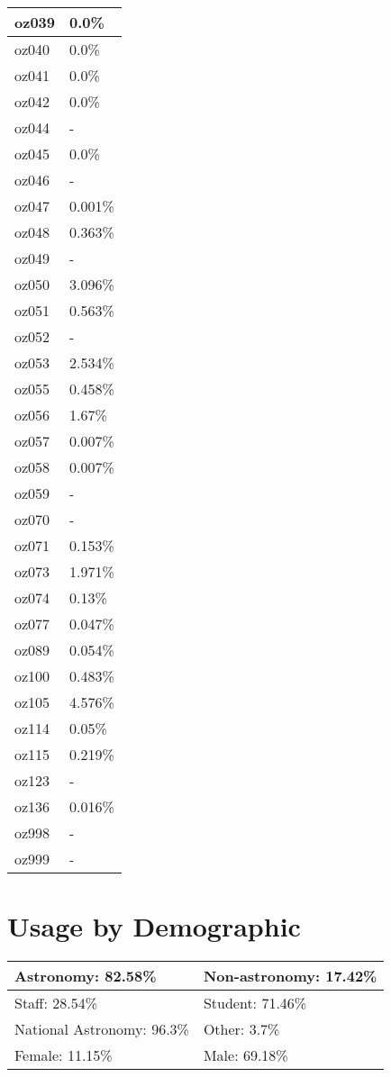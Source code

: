 \documentclass{article}%
\begin{document}
\begin{longtabu}{X[l] X[r]}
\hline%
oz039&0.0\%\\%
\hline%
oz040&0.0\%\\%
\hline%
oz041&0.0\%\\%
\hline%
oz042&0.0\%\\%
\hline%
oz044&{-}\\%
\hline%
oz045&0.0\%\\%
\hline%
oz046&{-}\\%
\hline%
oz047&0.001\%\\%
\hline%
oz048&0.363\%\\%
\hline%
oz049&{-}\\%
\hline%
oz050&3.096\%\\%
\hline%
oz051&0.563\%\\%
\hline%
oz052&{-}\\%
\hline%
oz053&2.534\%\\%
\hline%
oz055&0.458\%\\%
\hline%
oz056&1.67\%\\%
\hline%
oz057&0.007\%\\%
\hline%
oz058&0.007\%\\%
\hline%
oz059&{-}\\%
\hline%
oz070&{-}\\%
\hline%
oz071&0.153\%\\%
\hline%
oz073&1.971\%\\%
\hline%
oz074&0.13\%\\%
\hline%
oz077&0.047\%\\%
\hline%
oz089&0.054\%\\%
\hline%
oz100&0.483\%\\%
\hline%
oz105&4.576\%\\%
\hline%
oz114&0.05\%\\%
\hline%
oz115&0.219\%\\%
\hline%
oz123&{-}\\%
\hline%
oz136&0.016\%\\%
\hline%
oz998&{-}\\%
\hline%
oz999&{-}\\%
\hline%
\end{longtabu}%
\section{Usage by Demographic}%

%
\begin{longtabu}{X[l] X[l]}%
Astronomy:  82.58\%&Non{-}astronomy:  17.42\%\\%
\hline%
Staff:  28.54\%&Student:  71.46\%\\%
\hline%
National Astronomy:  96.3\%&Other:  3.7\%\\%
\hline%
Female:  11.15\%&Male:  69.18\%\\%
\hline%
\end{longtabu}%
\end{document}
